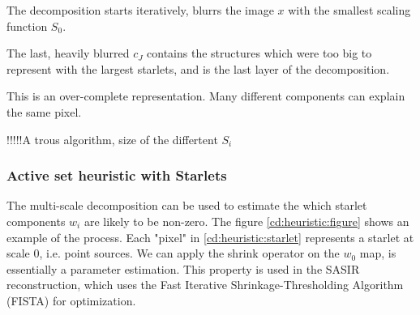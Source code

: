 The decomposition starts iteratively, blurrs the image $x$ with the smallest scaling function $S_0$. 


The last, heavily blurred $c_J$ contains the structures which were too big to represent with the largest starlets, and is the last layer of the decomposition.

This is an over-complete representation. Many different components can explain the same pixel.

!!!!!A trous algorithm, size of the differtent $S_i$



\subsubsection{Active set heuristic with Starlets}\label{cd:heuristic}

The multi-scale decomposition can be used to estimate the which starlet components $w_i$ are likely to be non-zero. The figure \ref{cd:heuristic:figure} shows an example of the process. Each "pixel" in \ref{cd:heuristic:starlet} represents a starlet at scale 0, i.e. point sources. We can apply the shrink operator on the $w_0$ map, is essentially a parameter estimation. This property is used in the SASIR\cite{girard2015sparse} reconstruction, which uses the Fast Iterative Shrinkage-Thresholding Algorithm (FISTA) for optimization.

